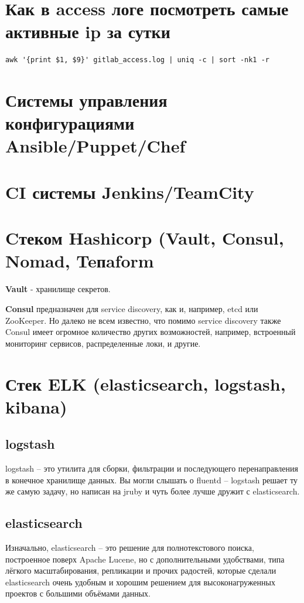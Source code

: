 \section{Как в access логе посмотреть самые активные ip за сутки}

\begin{lstlisting}
awk '{print $1, $9}' gitlab_access.log | uniq -c | sort -nk1 -r
\end{lstlisting}

\section{Системы управления конфигурациями Ansible/Puppet/Chef}
\section{CI системы Jenkins/TeamCity}
\section{Cтеком Hashicorp (Vault, Consul, Nomad, Teпaform}
\textbf{Vault} - хранилище секретов.

\textbf{Consul} предназначен для service discovery, как и, например, etcd или ZooKeeper. Но далеко не всем известно, что помимо service discovery также Consul имеет огромное количество других возможностей, например, встроенный мониторинг сервисов, распределенные локи, и другие. 
\section{Стек ELK (elasticsearch, logstash, kibana)}
\subsection{logstash}
logstash – это утилита для сборки, фильтрации и последующего перенаправления в конечное хранилище данных. Вы могли слышать о fluentd – logstash решает ту же самую задачу, но написан на jruby и чуть более лучше дружит с elasticsearch.
\subsection{elasticsearch}
Изначально, elasticsearch – это решение для полнотекстового поиска, построенное поверх Apache Lucene, но с дополнительными удобствами, типа лёгкого масштабирования, репликации и прочих радостей, которые сделали elasticsearch очень удобным и хорошим решением для высоконагруженных проектов с большими объёмами данных.
